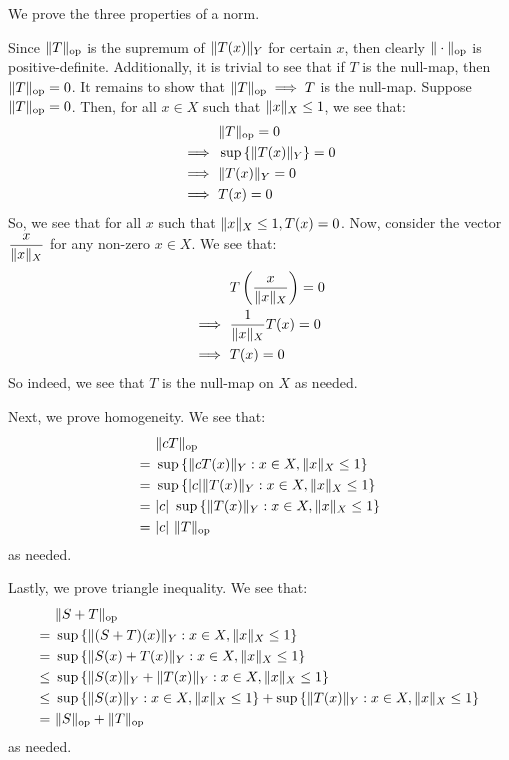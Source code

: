\documentclass{article}
\begin{document}
\begin{soln}
    We prove the three properties of a norm. \npgh

    Since $ \|T\|_{\textrm{op}} $ is the supremum of $ \|T(x)\|_{Y} $ for certain $ x $,
    then clearly $ \|\cdot\|_{\textrm{op}} $ is positive-definite.
    Additionally, it is trivial to see that if $ T $ is the null-map,
    then $ \|T\|_{\textrm{op}} = 0 $.
    It remains to show that $ \|T\|_{\textrm{op}} \implies T $ is the null-map. \vsp
    Suppose $ \|T\|_{\textrm{op}} = 0 $.
    Then, for all $ x \in X $ such that $ \|x\|_{X} \leq 1 $, we see that:
    \begin{align*}
        & \|T\|_{\textrm{op}} = 0 \\
        \implies \ & \sup \left\{{\|T(x)\|_{Y}}\right\} = 0 \\
        \implies \ & \|T(x)\|_{Y} = 0 \\
        \implies \ & T(x) = 0
    \end{align*}
    So, we see that for all $ x $ such that $ \|x\|_{X} \leq 1, T(x) = 0 $.
    Now, consider the vector $ \dfrac{x}{\|x\|_{X}} $ for any non-zero $ x \in X $.
    We see that:
    \begin{align*}
        & T \left( \frac{x}{\|x\|_{X}} \right) = 0 \\
        \implies \ & \frac{1}{\|x\|_{X}} T(x) = 0 \\
        \implies \ & T(x) = 0
    \end{align*}
    So indeed, we see that $ T $ is the null-map on $ X $ as needed. \npgh

    Next, we prove homogeneity. We see that:
    \begin{align*}
        & \|cT\|_{\textrm{op}} \\
        = \ & \sup \left\{{\|cT(x)\|_{Y} : x \in X, \|x\|_{X} \leq 1}\right\} \\
        = \ & \sup \left\{{\abs{c}\|T(x)\|_{Y} : x \in X, \|x\|_{X} \leq 1}\right\} \\
        = \ & \abs{c} \ \sup \left\{{\|T(x)\|_{Y} : x \in X, \|x\|_{X} \leq 1}\right\} \\
        = \ & \abs{c} \ \|T\|_{\textrm{op}}
    \end{align*}
    as needed. \npgh

    Lastly, we prove triangle inequality. We see that:
    \begin{align*}
        & \|S + T\|_{\textrm{op}} \\
        = \ & \sup \left\{{\|(S + T)(x)\|_{Y} : x \in X, \|x\|_{X} \leq 1}\right\} \\
        = \ & \sup \left\{{\|S(x) + T(x)\|_{Y} : x \in X, \|x\|_{X} \leq 1}\right\} \\
        \leq \ & \sup \left\{{\|S(x)\|_{Y} + \|T(x)\|_{Y} : x \in X, \|x\|_{X} \leq 1}\right\} \\
        \leq \ & \sup \left\{{\|S(x)\|_{Y} : x \in X, \|x\|_{X} \leq 1}\right\} +
        \sup \left\{{\|T(x)\|_{Y} : x \in X, \|x\|_{X} \leq 1}\right\} \\
        = \ & \|S\|_{\textrm{op}} + \|T\|_{\textrm{op}}
    \end{align*}
    as needed. \npgh


\end{soln}
\end{document}
